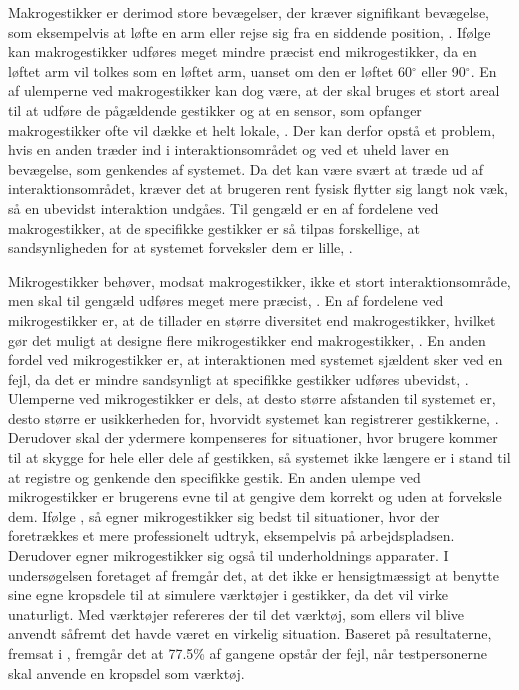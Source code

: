 Makrogestikker er derimod store bevægelser, der kræver signifikant bevægelse, som eksempelvis at løfte en arm eller rejse sig fra en siddende position, \parencite[s. 6]{PDF:UsabilityofMicroVsMacroGestures}. Ifølge \textcite[s. 9]{PDF:UsabilityofMicroVsMacroGestures} kan makrogestikker udføres meget mindre præcist end mikrogestikker, da en løftet arm vil tolkes som en løftet arm, uanset om den er løftet 60$^{\circ}$ eller 90$^{\circ}$. En af ulemperne ved makrogestikker kan dog være, at der skal bruges et stort areal til at udføre de pågældende gestikker og at en sensor, som opfanger makrogestikker ofte vil dække et helt lokale, \parencite[s. 9]{PDF:UsabilityofMicroVsMacroGestures}. Der kan derfor opstå et problem, hvis en anden træder ind i interaktionsområdet og ved et uheld laver en bevægelse, som genkendes af systemet. Da det kan være svært at træde ud af interaktionsområdet, kræver det at brugeren rent fysisk flytter sig langt nok væk, så en ubevidst interaktion undgåes. Til gengæld er en af fordelene ved makrogestikker, at de specifikke gestikker er så tilpas forskellige, at sandsynligheden for at systemet forveksler dem er lille, \parencite[s. 9]{PDF:UsabilityofMicroVsMacroGestures}.  

Mikrogestikker behøver, modsat makrogestikker, ikke et stort interaktionsområde, men skal til gengæld udføres meget mere præcist, \parencite[s. 10]{PDF:UsabilityofMicroVsMacroGestures}. En af fordelene ved mikrogestikker er, at de tillader en større diversitet end makrogestikker, hvilket gør det muligt at designe flere mikrogestikker end makrogestikker, \parencite[s. 10]{PDF:UsabilityofMicroVsMacroGestures}. En anden fordel ved mikrogestikker er, at interaktionen med systemet sjældent sker ved en fejl, da det er mindre sandsynligt at specifikke gestikker udføres ubevidst, \parencite[s. 10]{PDF:UsabilityofMicroVsMacroGestures}. Ulemperne ved mikrogestikker er dels, at desto større afstanden til systemet er, desto større er usikkerheden for, hvorvidt systemet kan registrerer gestikkerne, \parencite[s. 10]{PDF:UsabilityofMicroVsMacroGestures}. Derudover skal der ydermere kompenseres for situationer, hvor brugere kommer til at skygge for hele eller dele af gestikken, så systemet ikke længere er i stand til at registre og genkende den specifikke gestik. En anden ulempe ved mikrogestikker er brugerens evne til at gengive dem korrekt og uden at forveksle dem. Ifølge \textcite[s. 10]{PDF:UsabilityofMicroVsMacroGestures}, så egner mikrogestikker sig bedst til situationer, hvor der foretrækkes et mere professionelt udtryk, eksempelvis på arbejdspladsen. Derudover egner mikrogestikker sig også til underholdnings apparater.\blankline
%
I undersøgelsen foretaget af \textcite[s. 823]{PDF:UnderstandingNaturalness} fremgår det, at det ikke er hensigtmæssigt at benytte sine egne kropsdele til at simulere værktøjer i gestikker, da det vil virke unaturligt. Med værktøjer refereres der til det værktøj, som ellers vil blive anvendt såfremt det havde været en virkelig situation. Baseret på resultaterne, fremsat i \textcite[s. 823]{PDF:UnderstandingNaturalness}, fremgår det at 77.5\% af gangene opstår der fejl, når testpersonerne skal anvende en kropsdel som værktøj.

